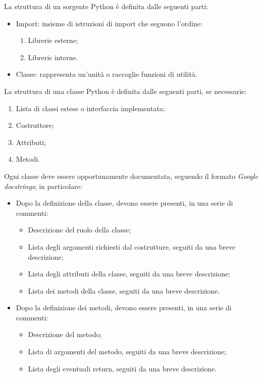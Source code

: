 \documentclass[10pt, a4paper]{article}
\begin{document}
La struttura di un sorgente Python è definita dalle seguenti parti:
\begin{itemize}
    \item Import: insieme di istruzioni di import che seguono l'ordine:
    \begin{enumerate}
        \item Librerie esterne;
        \item Librerie interne.
    \end{enumerate}
    \item Classe: rappresenta un'unità o raccoglie funzioni di utilità.
\end{itemize}
La struttura di una classe Python è definita dalle seguenti parti, se necessarie:
\begin{enumerate}
    \item Lista di classi estese o interfaccia implementata;
    \item Costruttore;
    \item Attributi;
    \item Metodi.
\end{enumerate}
Ogni classe deve essere opportunamente documentata, seguendo il formato \textit{Google docstrings}; in particolare:
\begin{itemize}
    \item Dopo la definizione della classe, devono essere presenti, in una serie di commenti:
    \begin{itemize}
        \item Descrizione del ruolo della classe;
        \item Lista degli argomenti richiesti dal costrutture, seguiti da una breve descrizione;
        \item Lista degli attributi della classe, seguiti da una breve descrizione;
        \item Lista dei metodi della classe, seguiti da una breve descrizione.
    \end{itemize}
    \item Dopo la definizione dei metodi, devono essere presenti, in una serie di commenti:
    \begin{itemize}
        \item Descrizione del metodo;
        \item Lista di argomenti del metodo, seguiti da una breve descrizione;
        \item Lista degli eventuali return, seguiti da una breve descrizione.
    \end{itemize}
\end{itemize}
\end{document}
